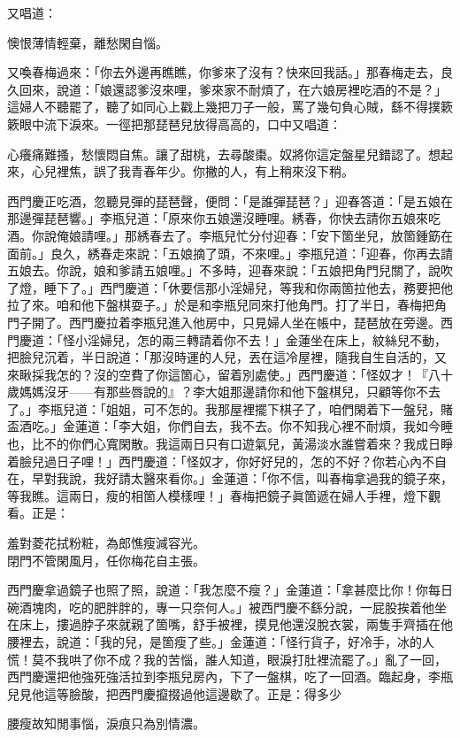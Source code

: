 又唱道：

\begin{myquote}
懊恨薄情輕棄，離愁閑自惱。
\end{myquote}

又喚春梅過來：「你去外邊再瞧瞧，你爹來了沒有？快來回我話。」那春梅走去，良久回來，說道：「娘還認爹沒來哩，爹來家不耐煩了，在六娘房裡吃酒的不是？」{}這婦人不聽罷了，聽了如同心上戳上幾把刀子一般，罵了幾句負心賊，繇不得撲簌簌眼中流下淚來。一徑把那琵琶兒放得高高的，口中又唱道：

\begin{myquote}
心癢痛難搔，愁懷悶自焦。讓了甜桃，去尋酸棗。奴將你這定盤星兒錯認了。想起來，心兒裡焦，誤了我青春年少。你撇的人，有上稍來沒下稍。
\end{myquote}

西門慶正吃酒，忽聽見彈的琵琶聲，便問：「是誰彈琵琶？」迎春答道：「是五娘在那邊彈琵琶響。」李瓶兒道：「原來你五娘還沒睡哩。綉春，你快去請你五娘來吃酒。你說俺娘請哩。」那綉春去了。李瓶兒忙分付迎春：「安下箇坐兒，放箇鍾筯在面前。」良久，綉春走來說：「五娘摘了頭，不來哩。」李瓶兒道：「迎春，你再去請五娘去。你說，娘和爹請五娘哩。」不多時，迎春來說：「五娘把角門兒關了，說吹了燈，睡下了。」西門慶道：「休要信那小淫婦兒，等我和你兩箇拉他去，務要把他拉了來。咱和他下盤棋耍子。」於是和李瓶兒同來打他角門。打了半日，春梅把角門子開了。西門慶拉着李瓶兒進入他房中，只見婦人坐在帳中，琵琶放在旁邊。西門慶道：「怪小淫婦兒，怎的兩三轉請着你不去！」金蓮坐在床上，紋絲兒不動，把臉兒沉着，半日說道：「那沒時運的人兒，丟在這冷屋裡，隨我自生自活的，又來瞅採我怎的？沒的空費了你這箇心，留着別處使。」{}西門慶道：「怪奴才！『八十歲媽媽沒牙——有那些唇說的』？李大姐那邊請你和他下盤棋兒，只顧等你不去了。」李瓶兒道：「姐姐，可不怎的。我那屋裡擺下棋子了，咱們閑着下一盤兒，賭盃酒吃。」金蓮道：「李大姐，你們自去，我不去。你不知我心裡不耐煩，我如今睡也，比不的你們心寬閑散。我這兩日只有口遊氣兒，黃湯淡水誰嘗着來？我成日睜着臉兒過日子哩！」{}西門慶道：「怪奴才，你好好兒的，怎的不好？你若心內不自在，早對我說，我好請太醫來看你。」金蓮道：「你不信，叫春梅拿過我的鏡子來，等我瞧。這兩日，瘦的相箇人模樣哩！」春梅把鏡子眞箇遞在婦人手裡，燈下觀看。正是：

\begin{myquote}
羞對菱花拭粉粧，為郎憔瘦減容光。\\閉門不管閑風月，任你梅花自主張。
\end{myquote}

西門慶拿過鏡子也照了照，說道：「我怎麼不瘦？」金蓮道：「拿甚麼比你！你每日碗酒塊肉，吃的肥胖胖的，專一只奈何人。」被西門慶不繇分說，一屁股挨着他坐在床上，摟過脖子來就親了箇嘴，舒手被裡，摸見他還沒脫衣裳，兩隻手齊插在他腰裡去，說道：「我的兒，是箇瘦了些。」金蓮道：「怪行貨子，好冷手，冰的人慌！莫不我哄了你不成？我的苦惱，誰人知道，眼淚打肚裡流罷了。」亂了一回，西門慶還把他強死強活拉到李瓶兒房內，下了一盤棋，吃了一回酒。臨起身，李瓶兒見他這等臉酸，把西門慶攛掇過他這邊歇了。正是：得多少

\begin{myquote}
腰瘦故知閒事惱，淚痕只為別情濃。
\end{myquote}

